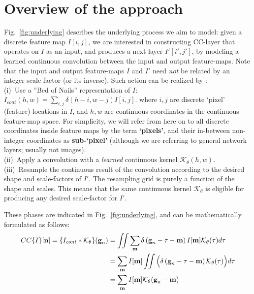 \section{Overview of the approach}
\label{sec:overview}
Fig.~\ref{fig:underlying} describes the underlying process we aim to model:
given a discrete feature map $I[i,j]$, we are interested in constructing  CC-layer that operates on $I$ as an input, and produces a next layer $I'[i',j']$, by modeling a learned continuous convolution between the input and output feature-maps.
Note that the input and output feature-maps  $I$ and $I'$ need \emph{not} be related by an integer  scale factor (or its inverse).
%
Such  action can be realized by : 
\vspace*{0.1cm} \\ 
(i)~Use a ''Bed of Nails'' representation of $I$:
$I_{cont}(h,w) = \sum_{i,j}\delta(h-i, w-j)I[i,j]$.
where $i,j$ are discrete `pixel' (feature) locations in $I$, and $h,w$ are continuous coordinates in the continuous feature-map space. 
For simplicity, {we will refer from here on  to all discrete coordinates inside feature maps by the term \textbf{`pixels'}, and their in-between non-integer coordinates as \textbf{sub-`pixel'} (although we are referring to general network layers; usually not images)}. 
\vspace*{0.1cm} \\
(ii)~Apply a convolution with a \emph{learned} continuous kernel $\mathcal{K}_\theta(h,w)$.
\vspace*{0.1cm} \\
(iii)~Resample the continuous result of the convolution according to the desired shape and scale-factors of $I'$. The resampling grid is purely a function of the shape and scales.
This means that the same continuous kernel $\mathcal{K}_\theta$ is eligible for producing any desired scale-factor for $I'$.

These phases are indicated in Fig.~\ref{fig:underlying}, and can be mathematically formulated as follows:
\begin{align}
    CC\{I\}[\textbf{n}] = \{I_{cont} * \mathcal{K}_{\theta}\}(\textbf{g}_n)
    &=
   \iint\sum_{\textbf{m}}\delta
   \left(\textbf{g}_n-\mathbf{\tau}-\textbf{m}\right)
    I[\textbf{m}] \mathcal{K}_\theta(\mathbf{\tau})d \mathbf{\tau} \notag\\
    &=
  \sum_{\textbf{m}}I[\textbf{m}]\iint
  \Big(\delta\left(
  \textbf{g}_n-\mathbf{\tau}-\textbf{m}\right)
     \mathcal{K}_\theta(\mathbf{\tau})\Big)d \mathbf{\tau} \notag\\
   &=\sum_{\textbf{m}}
     I[\textbf{m}]\mathcal{K}_\theta(\textbf{g}_n-\textbf{m})
\label{eq:underlying}
\end{align}



